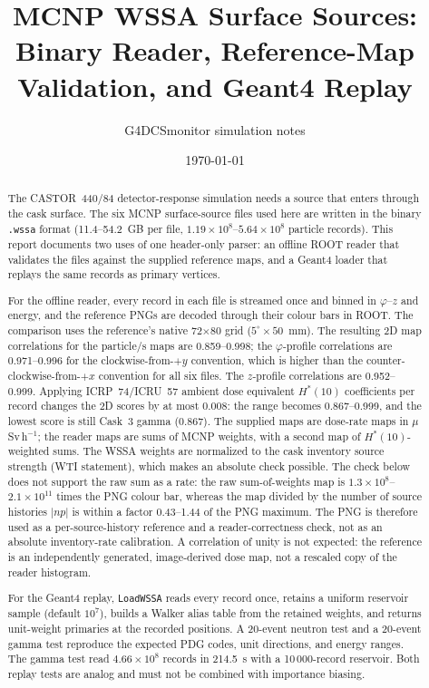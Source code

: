 \documentclass[11pt,a4paper]{article}
\title{MCNP WSSA Surface Sources:\\
Binary Reader, Reference-Map Validation, and Geant4 Replay}
\author{G4DCSmonitor simulation notes}
\date{\today}
\begin{document}
\maketitle

\begin{abstract}
\noindent
The CASTOR~440/84 detector-response simulation needs a source that enters
through the cask surface.  The six MCNP surface-source files used here are
written in the binary \texttt{.wssa} format (11.4--54.2~GB per file,
$1.19\times10^{8}$--$5.64\times10^{8}$ particle records).  This report documents
two uses of one header-only parser: an offline ROOT reader that validates the
files against the supplied reference maps, and a Geant4 loader that replays the
same records as primary vertices.

For the offline reader, every record in each file is streamed once and binned
in $\varphi$--$z$ and energy, and the reference PNGs are decoded through their
colour bars in ROOT.  The comparison uses the reference's native
72$\times$80 grid ($5^\circ\times50$~mm).  The resulting 2D map correlations
for the particle/s maps are 0.859--0.998; the $\varphi$-profile correlations are
0.971--0.996 for the clockwise-from-$+y$ convention, which is higher than the
counter-clockwise-from-$+x$ convention for all six files.  The $z$-profile
correlations are 0.952--0.999.  Applying ICRP~74/ICRU~57 ambient dose equivalent
$H^*(10)$ coefficients per record changes the 2D scores by at most 0.008: the
range becomes 0.867--0.999, and the lowest score is still Cask~3 gamma (0.867).
The supplied maps are dose-rate maps in $\mu$Sv\,h$^{-1}$; the reader maps are
sums of MCNP weights, with a second map of $H^*(10)$-weighted sums.  The WSSA
weights are normalized to the cask inventory source strength (WTI statement),
which makes an absolute check possible.  The check below does not support the
raw sum as a rate: the raw sum-of-weights map is $1.3\times10^{8}$--$2.1\times10^{11}$
times the PNG colour bar, whereas the map divided by the number of source histories
$|np|$ is within a factor 0.43--1.44 of the PNG maximum.  The PNG is therefore used as a per-source-history reference and a
reader-correctness check, not as an absolute inventory-rate calibration.  A
correlation of unity is not expected: the reference is an independently
generated, image-derived dose map, not a rescaled copy of the reader histogram.

For the Geant4 replay, \texttt{LoadWSSA} reads every record once, retains a
uniform reservoir sample (default $10^{7}$), builds a Walker alias table from the
retained weights, and returns unit-weight primaries at the recorded positions.
A 20-event neutron test and a 20-event gamma test reproduce the expected PDG
codes, unit directions, and energy ranges.  The gamma test read
$4.66\times10^{8}$ records in 214.5~s with a 10\,000-record reservoir.  Both
replay tests are analog and must not be combined with importance biasing.
\end{abstract}
\end{document}
